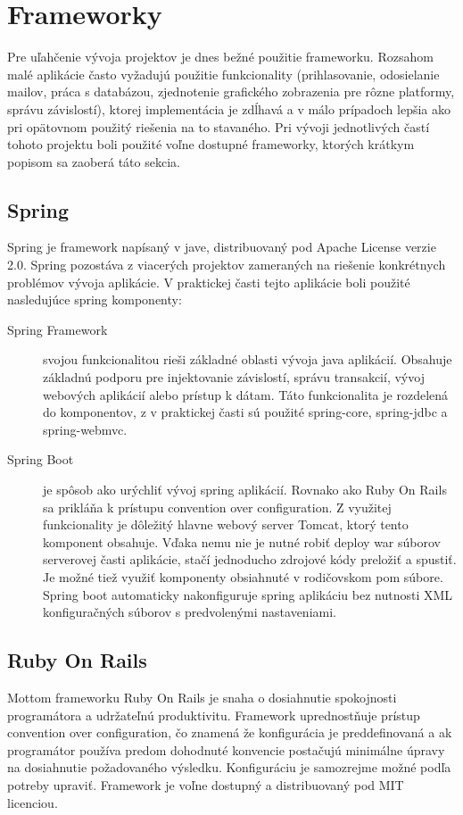 \section{Frameworky}
	Pre uľahčenie vývoja projektov je dnes bežné použitie frameworku. Rozsahom malé aplikácie často vyžadujú použitie funkcionality (prihlasovanie, odosielanie mailov, práca s databázou, zjednotenie grafického zobrazenia pre rôzne platformy, správu závislostí), ktorej implementácia je zdĺhavá a v málo prípadoch lepšia ako pri opätovnom použitý riešenia na to stavaného. Pri vývoji jednotlivých častí tohoto projektu boli použité voľne dostupné frameworky, ktorých krátkym popisom sa zaoberá táto sekcia.

	\subsection{Spring}
	Spring je framework napísaný v jave, distribuovaný pod Apache License verzie 2.0. Spring pozostáva z viacerých projektov zameraných na riešenie konkrétnych problémov vývoja aplikácie. V praktickej časti tejto aplikácie boli použité nasledujúce spring komponenty:
	\begin{description}
		\item[Spring Framework] svojou funkcionalitou rieši základné oblasti vývoja java aplikácií. Obsahuje základnú podporu pre injektovanie závislostí, správu transakcií, vývoj webových aplikácií alebo prístup k dátam. Táto funkcionalita je rozdelená do komponentov, z v praktickej časti sú použité spring-core, spring-jdbc a spring-webmvc.
		
		\item[Spring Boot] je spôsob ako urýchliť vývoj spring aplikácií. Rovnako ako Ruby On Rails sa prikláňa k prístupu convention over configuration. Z využitej funkcionality je dôležitý hlavne webový server Tomcat, ktorý tento komponent obsahuje. Vďaka nemu nie je nutné robiť deploy war súborov serverovej časti aplikácie, stačí jednoducho zdrojové kódy preložiť a spustiť. Je možné tiež využiť komponenty obsiahnuté v rodičovskom pom súbore. Spring boot automaticky nakonfiguruje spring aplikáciu bez nutnosti XML konfiguračných súborov s predvolenými nastaveniami.
	\end{description}
		
	\subsection{Ruby On Rails}
	Mottom frameworku Ruby On Rails je snaha o dosiahnutie spokojnosti programátora a udržateľnú produktivitu. Framework uprednostňuje prístup convention over configuration, čo znamená že konfigurácia je preddefinovaná a ak programátor používa predom dohodnuté konvencie postačujú minimálne úpravy na dosiahnutie požadovaného výsledku. Konfiguráciu je samozrejme možné podľa potreby upraviť. Framework je voľne dostupný a distribuovaný pod MIT licenciou.
	

